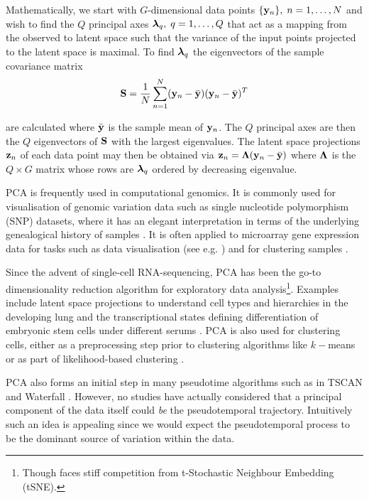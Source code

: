 Mathematically, we start with $G$-dimensional data points $\{\mathbf{y}_n\}, \; n = 1, \ldots, N$ and wish to find the $Q$ principal axes $\bm{\lambda}_q, \; q = 1, \ldots, Q$ that act as a mapping from the observed to latent space such that the variance of the input points projected to the latent space is maximal. To find $\bm{\lambda}_q$ the eigenvectors of the sample covariance matrix
\begin{equation}
  \mathbf{S} = \frac{1}{N}\sum_{n = 1}^N (\mathbf{y}_n - \bar{\mathbf{y}}) (\mathbf{y}_n - \bar{\mathbf{y}})^T
\end{equation}

are calculated where $\bar{\mathbf{y}}$ is the sample mean of $\mathbf{y}_n$. The $Q$ principal axes are then the $Q$ eigenvectors of $\mathbf{S}$ with the largest eigenvalues. The latent space projections $\mathbf{z}_n$ of each data point may then be obtained via $\mathbf{z}_n = \bm{\Lambda} (\mathbf{y}_n - \bar{\mathbf{y}})$ where $\bm{\Lambda}$ is the $Q \times G$ matrix whose rows are $\bm{\lambda}_q$ ordered by decreasing eigenvalue.

PCA is frequently used in computational genomics. It is commonly used for visualisation of genomic variation data such as single nucleotide polymorphism (SNP) datasets, where it has an elegant interpretation in terms of the underlying genealogical history of samples \cite{mcvean2009genealogical}.
It is often applied to microarray gene expression data for tasks such as data visualisation (see e.g. \cite{ringner2008principal}) and for clustering samples \cite{yeung2001principal}.

Since the advent of single-cell RNA-sequencing, PCA has been the go-to dimensionality reduction algorithm for exploratory data analysis\footnote{Though faces stiff competition from t-Stochastic Neighbour Embedding (tSNE).}. Examples include latent space projections to understand cell types and hierarchies in the developing lung \cite{Treutlein2014-ob} and the transcriptional states defining differentiation of embryonic stem cells under different serums \cite{kolodziejczyk2015single}. PCA is also used for clustering cells, either as a preprocessing step prior to clustering algorithms like $k-$means or as part of likelihood-based clustering \cite{yau2016pcareduce}.

PCA also forms an initial step in many pseudotime algorithms such as in TSCAN \cite{Ji2016-gx} and Waterfall \cite{Shin2015}. However, no studies have actually considered that a principal component of the data itself could \emph{be} the pseudotemporal trajectory. Intuitively such an idea is appealing since we would expect the pseudotemporal process to be the dominant source of variation within the data.

